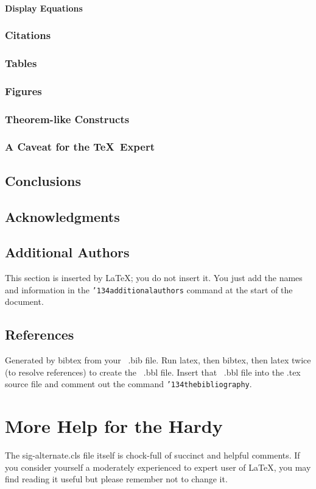 \documentclass{sig-alternate}
\begin{document}
\paragraph{Display Equations}
\subsubsection{Citations}
\subsubsection{Tables}
\subsubsection{Figures}
\subsubsection{Theorem-like Constructs}
\subsubsection*{A Caveat for the \TeX\ Expert}
\subsection{Conclusions}
\subsection{Acknowledgments}
\subsection{Additional Authors}
This section is inserted by \LaTeX; you do not insert it.
You just add the names and information in the
\texttt{{\char'134}additionalauthors} command at the start
of the document.
\subsection{References}
Generated by bibtex from your ~.bib file.  Run latex,
then bibtex, then latex twice (to resolve references)
to create the \cite{mur} ~.bbl file. \cite{roadalarm} Insert that ~.bbl file into
the .tex source file and comment out
the command \texttt{{\char'134}thebibliography}.
\section{More Help for the Hardy}
The sig-alternate.cls file itself is chock-full of succinct
and helpful comments.  If you consider yourself a moderately
experienced to expert user of \LaTeX, you may find reading
it useful but please remember not to change it.
\end{document}
